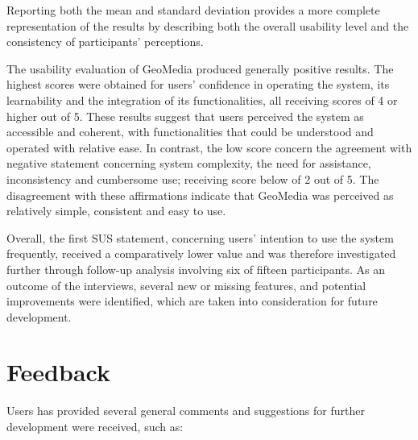 Reporting both the mean and standard deviation provides a more complete representation of the results by describing both the overall usability level and the consistency of participants' perceptions.

The usability evaluation of GeoMedia produced generally positive results. The highest scores were obtained for users' confidence in operating the system, its learnability and the integration of its functionalities, all receiving scores of 4 or higher out of 5. These results suggest that users perceived the system as accessible and coherent, with functionalities that could be understood and operated with relative ease. In contrast, the low score concern the agreement with negative statement concerning system complexity, the need for assistance, inconsistency and cumbersome use; receiving score below of 2 out of 5. The disagreement with these affirmations indicate that GeoMedia was perceived as relatively simple, consistent and easy to use.

Overall, the first SUS statement, concerning users' intention to use the system frequently, received a comparatively lower value and was therefore investigated further through follow-up analysis involving six of fifteen participants. As an outcome of the interviews, several new or missing features, and potential improvements were identified, which are taken into consideration for future development.


\section{Feedback}

Users has provided several general comments and suggestions for further development were received, such as:

